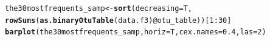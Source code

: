 \documentclass[12pt]{article}\usepackage[]{graphicx}\usepackage[]{color}
\makeatletter
\newcommand{\hlnum}[1]{\textcolor[rgb]{0.686,0.059,0.569}{#1}}%
\newcommand{\hlopt}[1]{\textcolor[rgb]{0,0,0}{#1}}%
\newcommand{\hlstd}[1]{\textcolor[rgb]{0.345,0.345,0.345}{#1}}%
\newcommand{\hlkwb}[1]{\textcolor[rgb]{0.69,0.353,0.396}{#1}}%
\newcommand{\hlkwc}[1]{\textcolor[rgb]{0.333,0.667,0.333}{#1}}%
\newcommand{\hlkwd}[1]{\textcolor[rgb]{0.737,0.353,0.396}{\textbf{#1}}}%
\newenvironment{kframe}{%
 \def\at@end@of@kframe{}%
 \ifinner\ifhmode%
  \def\at@end@of@kframe{\end{minipage}}%
  \begin{minipage}{\columnwidth}%
 \fi\fi%
 \def\FrameCommand##1{\hskip\@totalleftmargin \hskip-\fboxsep
 \colorbox{shadecolor}{##1}\hskip-\fboxsep
     \hskip-\linewidth \hskip-\@totalleftmargin \hskip\columnwidth}%
 \MakeFramed {\advance\hsize-\width
   \@totalleftmargin\z@ \linewidth\hsize
   \@setminipage}}%
 {\par\unskip\endMakeFramed%
 \at@end@of@kframe}
\newenvironment{knitrout}{}{} %
\numberwithin{figure}{section}
\makeatother
\begin{document}
\begin{knitrout}\small
{}\color{fgcolor}\begin{kframe}
\begin{alltt}
\hlstd{the30mostfrequents_samp} \hlkwb{<-} \hlkwd{sort}\hlstd{(}\hlkwc{decreasing} \hlstd{= T,}
                                \hlkwd{rowSums}\hlstd{(}\hlkwd{as.binaryOtuTable}\hlstd{(data.f3)}\hlopt{@}\hlkwc{otu_table}\hlstd{))[}\hlnum{1}\hlopt{:}\hlnum{30}\hlstd{]}
\hlkwd{barplot}\hlstd{(the30mostfrequents_samp,} \hlkwc{horiz} \hlstd{= T,} \hlkwc{cex.names} \hlstd{=} \hlnum{0.4}\hlstd{,} \hlkwc{las} \hlstd{=} \hlnum{2}\hlstd{)}
\end{alltt}
\end{kframe}
\end{knitrout}
\end{document}
